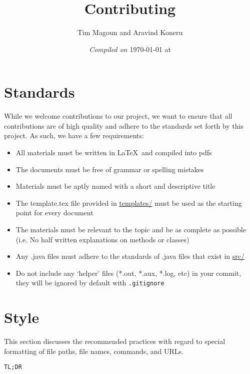\documentclass[11pt,fleqn]{article}
\begin{document}
\title{Contributing}%
\author{Tim Magoun and Aravind Koneru}
\date{\textit{Compiled on} \today \hspace{1mm} at \currenttime}
\maketitle

\section*{Standards}
While we welcome contributions to our project, we want to ensure that all contributions are of high
quality and adhere to the standards set forth by this project. As such, we have a few requirements:

\begin{itemize}
\item
All materials must be written in \LaTeX\ and compiled into pdfs

\item
The documents must be free of grammar or spelling mistakes 

\item
Materials must be aptly named with a short and descriptive title

\item
The template.tex file provided in \underline{templates/} must be used as the starting point for every document

\item
The materials must be relevant to the topic and be as complete as possible (i.e. No half written explanations on methods or classes)

\item
Any .java files must adhere to the standards of .java files that exist in \underline{src/} 

\item
Do not include any `helper' files (*.out, *.aux, *.log, etc) in your commit, they will be ignored by default with \texttt{.gitignore}
\end{itemize}

\newpage
\section*{Style}

This section discusses the recommended practices with regard to special formatting of file paths, file names, commands, and URLs.

\texttt{TL;DR}
\end{document}
